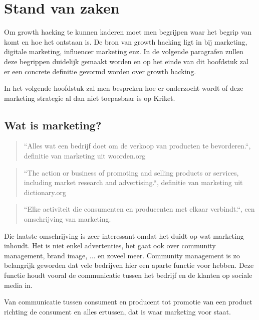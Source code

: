 \chapter{Stand van zaken} \label{ch:stand-van-zaken}


Om growth hacking te kunnen kaderen moet men begrijpen waar het begrip van komt en hoe het ontstaan is. De bron van growth hacking ligt in bij marketing, digitale marketing, influencer marketing enz. In de volgende paragrafen zullen deze begrippen duidelijk gemaakt worden en op het einde van dit hoofdstuk zal er een concrete definitie gevormd worden over growth hacking.

In het volgende hoofdstuk zal men bespreken hoe er onderzocht wordt of deze marketing strategie al dan niet toepasbaar is op Kriket.

\section{Wat is marketing?} \label{sec:marketing}
\begin{quote}
	``Alles wat een bedrijf doet om de verkoop van producten te bevorderen.``, definitie van marketing uit woorden.org
\end{quote}
\begin{quote}
	``The action or business of promoting and selling products or services, including market research and advertising.``, definitie van marketing uit dictionary.org
\end{quote}
\begin{quote}
``Elke activiteit die consumenten en producenten met elkaar verbindt.``, een omschrijving van marketing.
\end{quote}

Die laatste omschrijving is zeer interessant omdat het duidt op wat marketing inhoudt. Het is niet enkel advertenties, het gaat ook over community management, brand image, ... en zoveel meer. Community management is zo belangrijk geworden dat vele bedrijven hier een aparte functie voor hebben. Deze functie houdt vooral de communicatie tussen het bedrijf en de klanten op sociale media in. 

Van communicatie tussen consument en producent tot promotie van een product richting de consument en alles ertussen, dat is waar marketing voor staat.

